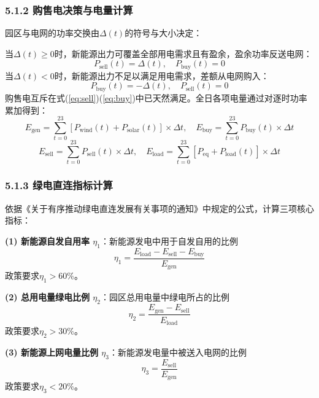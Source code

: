 \documentclass[zihao=-4,a4paper]{ctexart} %
\begin{document}
	\subsubsection*{5.1.2 购售电决策与电量计算}
	园区与电网的功率交换由$\Delta(t)$的符号与大小决定：\par
	当$\Delta(t) \geq 0$时，新能源出力可覆盖全部用电需求且有盈余，盈余功率反送电网：
	\begin{equation}
		P_{\text{sell}}(t) = \Delta(t),\quad P_{\text{buy}}(t) = 0
		\label{eq:sell}
	\end{equation}
	当$\Delta(t) < 0$时，新能源出力不足以满足用电需求，差额从电网购入：
	\begin{equation}
		P_{\text{buy}}(t) = -\Delta(t),\quad P_{\text{sell}}(t) = 0
		\label{eq:buy}
	\end{equation}
	购售电互斥在式(\ref{eq:sell})(\ref{eq:buy})中已天然满足。全日各项电量通过对逐时功率累加得到：
	\begin{equation}
		E_{\text{gen}} = \sum_{t=0}^{23} \left[P_{\text{wind}}(t) + P_{\text{solar}}(t)\right] \times \Delta t,\quad
		E_{\text{buy}} = \sum_{t=0}^{23} P_{\text{buy}}(t) \times \Delta t
		\label{eq:energy}
	\end{equation}
	\begin{equation}
		E_{\text{sell}} = \sum_{t=0}^{23} P_{\text{sell}}(t) \times \Delta t,\quad
		E_{\text{load}} = \sum_{t=0}^{23} \left[P_{\text{eq}} + P_{\text{load}}(t)\right] \times \Delta t
		\label{eq:energy2}
	\end{equation}
	\subsubsection*{5.1.3 绿电直连指标计算}
	依据《关于有序推动绿电直连发展有关事项的通知》\cite{4}中规定的公式，计算三项核心指标：
	\par\textbf{(1) 新能源自发自用率 $\eta_1$}：新能源发电中用于自发自用的比例
	\begin{equation}
		\eta_1 = \frac{E_{\text{load}} - E_{\text{sell}} - E_{\text{buy}}}{E_{\text{gen}}}
		\label{eq:eta1}
	\end{equation}
	政策要求$\eta_1 > 60\%$。
	\par\textbf{(2) 总用电量绿电比例 $\eta_2$}：园区总用电量中绿电所占的比例
	\begin{equation}
		\eta_2 = \frac{E_{\text{gen}} - E_{\text{sell}}}{E_{\text{load}}}
		\label{eq:eta2}
	\end{equation}
	政策要求$\eta_2 > 30\%$。
	\par\textbf{(3) 新能源上网电量比例 $\eta_3$}：新能源发电量中被送入电网的比例
	\begin{equation}
		\eta_3 = \frac{E_{\text{sell}}}{E_{\text{gen}}}
		\label{eq:eta3}
	\end{equation}
	政策要求$\eta_3 < 20\%$。
\end{document}
